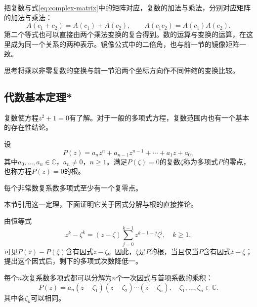 把复数与式\eqref{eq:complex-matrix}中的矩阵对应，复数的加法与乘法，分别对应矩阵的加法与乘法：
\begin{equation}
    A \left( c_{1} + c_{2} \right) = A \left( c_{1} \right) + A \left( c_{2} \right) , \qquad
    A \left( c_{1} c_{2} \right) = A \left( c_{1} \right) A \left( c_{2} \right) .
\end{equation}
第二个等式也可以直接由两个乘法变换的复合得到。数的运算与变换的运算，在这里成为同一个关系的两种表示。镜像公式中的二倍角，也与前一节的镜像矩阵一致。

{\kaiti{}思考\quad 将乘以非零复数的变换与前一节沿两个坐标方向作不同伸缩的变换比较。}

\subsection{代数基本定理*}
\label{subsec:fundamental-theorem-of-algebra}
复数使方程\(z^{2} + 1 = 0\)有了解。对于一般的多项式方程，复数范围内也有一个基本的存在性结论。

设
\begin{equation}
    P \left( z \right) = a_{n} z^{n} + a_{n - 1} z^{n - 1} + \cdots + a_{1} z + a_{0} ,
\end{equation}
其中\(a_{0} , \ldots , a_{n} \in \mathbb{C}\)，\(a_{n} \ne 0\)，\(n \ge 1\)。满足\(P \left( \zeta \right) = 0\)的复数\(\zeta\)称为多项式\(P\)的{\heiti{}零点}，也称方程\(P \left( z \right) = 0\)的{\heiti{}根}。

\begin{theorem}[代数基本定理]\label{thm:fundamental-theorem-of-algebra}
每个非常数复系数多项式至少有一个复零点。
\end{theorem}

本节引用这一定理，下面证明它关于因式分解与根的直接推论。

由恒等式
\begin{equation}
    z^{k} - \zeta^{k}
    = \left( z - \zeta \right) \sum_{j = 0}^{k - 1} z^{k - 1 - j} \zeta^{j} ,
    \quad k \ge 1 ,
\end{equation}
可见\(P \left( z \right) - P \left( \zeta \right)\)含有因式\(z - \zeta\)。因此，\(\zeta\)是\(P\)的根，当且仅当\(P\)含有因式\(z - \zeta\)；提出这个因式后，剩下的多项式次数降低一。

\begin{corollary}\label{cor:complex-polynomial-factorization}
每个\(n\)次复系数多项式都可以分解为\(n\)个一次因式与首项系数的乘积：
\begin{equation}\label{eq:complex-polynomial-factorization}
    P \left( z \right) = a_{n} \left( z - \zeta_{1} \right) \left( z - \zeta_{2} \right) \cdots \left( z - \zeta_{n} \right) ,
    \quad \zeta_{1} , \ldots , \zeta_{n} \in \mathbb{C} .
\end{equation}
其中各\(\zeta_{k}\)可以相同。
\end{corollary}

